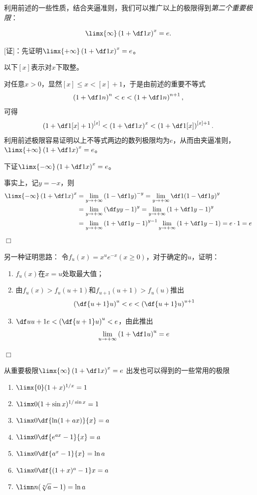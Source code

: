 利用前述的一些性质，结合夹逼准则，我们可以推广以上的极限得到{\it 第二个重要极限}：
\begin{thx}
	$$\limx{\infty}\left(1+\df1x\right)^x=e.$$
\end{thx}

[证]：先证明$\limx{+\infty}\left(1+\df1x\right)^x=e$。

以下$[x]$表示对$x$下取整。

对任意$x>0$，显然$[x]\leq x<[x]+1$，于是由前述的重要不等式
$$\left(1+\df1n\right)^n<e<\left(1+\df1n\right)^{n+1},$$
可得
$$\left(1+\df1{[x]+1}\right)^{[x]}<\left(1+\df1x\right)^x
<\left(1+\df1{[x]}\right)^{[x]+1}.$$
利用前述极限容易证明以上不等式两边的数列极限均为$e$，从而由夹逼准则，
$\limx{+\infty}\left(1+\df1x\right)^x=e$。

下证$\limx{-\infty}\left(1+\df1x\right)^x=e$。

事实上，记$y=-x$，则
\begin{align*}
	\limx{-\infty}\left(1+\df1x\right)^x
	&=\lim\limits_{y\to+\infty}\left(1-\df1y\right)^{-y}
	=\lim\limits_{y\to+\infty}\df1{\left(1-\df1y\right)^{y}}\\
	&=\lim\limits_{y\to+\infty}\left(\df y{y-1}\right)^{y}
	=\lim\limits_{y\to+\infty}\left(1+\df1{y-1}\right)^{y}\\
	&=\lim\limits_{y\to+\infty}\left(1+\df1{y-1}\right)^{y-1}
	\lim\limits_{y\to+\infty}\left(1+\df1{y-1}\right)=e\cdot1=e
\end{align*}
\hfill $\Box$

\begin{shaded}
另一种证明思路：
令$f_u(x)=x^ue^{-x}(x\geq 0)$，对于确定的$u$，证明：
\begin{enumerate}[(1)]
  \setlength{\itemindent}{1cm}
  \item $f_u(x)$在$x=u$处取最大值；
  \item 由$f_u(x)>f_u(u+1)$和$f_{u+1}(u+1)>f_u(u)$推出
  $$\left(\df{u+1}u\right)^u<e<\left(\df{u+1}u\right)^{u+1}$$
  \item $\df u{u+1}e<\left(\df{u+1}u\right)^u<e$，由此推出
  $$\lim\limits_{u\to+\infty}\left(1+\df 1u\right)^u=e$$
\end{enumerate}
\hfill $\Box$
\end{shaded}

从重要极限$\limx{\infty}\left(1+\df1x\right)^x=e$
出发也可以得到的一些常用的极限
\begin{thx}
\begin{enumerate}[(1)]
  \item $\limx{0}(1+x)^{1/x}=1$ 
  \item $\limx 0(1+\sin x)^{1/\sin x}=1$ 
  \item $\limx 0\df{\ln(1+ax)}{x}=a$
  \item $\limx 0\df{e^{ax}-1}{x}=a$ 
  \item $\limx 0\df{a^x-1}{x}=\ln a$ 
  \item $\limx 0\df{(1+x)^a-1}x=a$
  \item $\limn n(\sqrt[n]{a}-1)=\ln a$ 
\end{enumerate}
\end{thx}

